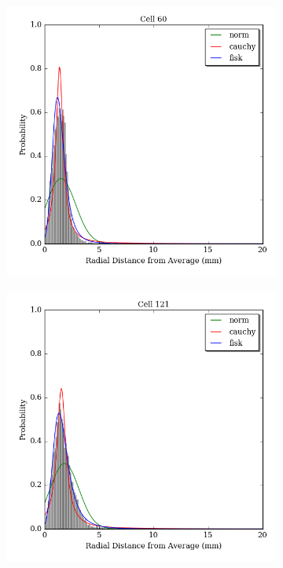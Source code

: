 \documentclass[12pt]{article}
\begin{document}
\begin{figure}
\centering
\begin{subfigure}{.5\textwidth}
  \centering
  \includegraphics[width=\linewidth]{../figures/cellfigs/probdens60.png}
  \label{fig:sub1}
\end{subfigure}%
\begin{subfigure}{.5\textwidth}
  \centering
  \includegraphics[width=\linewidth]{../figures/cellfigs/probdens121.png}
  \label{fig:sub2}
\end{subfigure}
\label{fig:test}


\end{figure}
\end{document}
